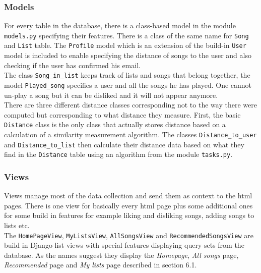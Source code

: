  \subsubsection{Models}
 
 For every table in the database, there is a class-based model in the module \texttt{models.py} specifying their features. There is a class of the same name for \texttt{Song} and \texttt{List} table. The \texttt{Profile} model which is an extension of the build-in \texttt{User} model is included to enable specifying the distance of songs to the user and also checking if the user has confirmed his email.\\
 
The class \texttt{Song\_in\_list} keeps track of lists and songs that belong together, the model \texttt{Played\_song} specifies a user and all the songs he has played. One cannot un-play a song but it can be disliked and it will not appear anymore. \\

There are three different distance classes corresponding not to the way there were computed but corresponding to what distance they measure. First, the basic \texttt{Distance} class is the only class that actually stores distance based on a calculation of a similarity measurement algorithm. The classes \texttt{Distance\_to\_user} and \texttt{Distance\_to\_list} then calculate their distance data based on what they find in the \texttt{Distance} table using an algorithm from the module \texttt{tasks.py}.
 
\subsubsection{Views}

Views manage most of the data collection and send them as context to the html pages. There is one view for basically every html page plus some additional ones for some build in features for example liking and disliking songs, adding songs to lists etc. \\

The \texttt{HomePageView}, \texttt{MyListsView}, \texttt{AllSongsView} and \texttt{RecommendedSongsView} are build in Django list views with special features displaying query-sets from the database. As the names suggest they display the \textit{Homepage}, \textit{All songs} page, \textit{Recommended} page and \textit{My lists} page described in section 6.1. \\

